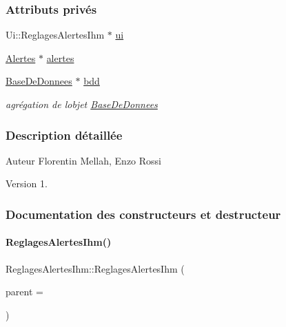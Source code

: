 \subsubsection*{Attributs privés}
\begin{DoxyCompactItemize}
\item 
Ui\+::\+Reglages\+Alertes\+Ihm $\ast$ \hyperlink{class_reglages_alertes_ihm_af3a1fcc84fb1c76248b330372947b245}{ui}
\item 
\hyperlink{class_alertes}{Alertes} $\ast$ \hyperlink{class_reglages_alertes_ihm_a9afa97e737d3c6a9a28a23fc4bc4beeb}{alertes}
\item 
\hyperlink{class_base_de_donnees}{Base\+De\+Donnees} $\ast$ \hyperlink{class_reglages_alertes_ihm_a91b511776c98009cf8f951ec9f3e564e}{bdd}
\begin{DoxyCompactList}\small\item\em agrégation de l\textquotesingle{}objet \hyperlink{class_base_de_donnees}{Base\+De\+Donnees} \end{DoxyCompactList}\end{DoxyCompactItemize}


\subsubsection{Description détaillée}
\begin{DoxyAuthor}{Auteur}
Florentin Mellah, Enzo Rossi
\end{DoxyAuthor}
\begin{DoxyVersion}{Version}
1. 
\end{DoxyVersion}


\subsubsection{Documentation des constructeurs et destructeur}
\mbox{\label{class_reglages_alertes_ihm_ae6337f2d05a3184e48bf5022a91f06c7}} 
\paragraph{\texorpdfstring{Reglages\+Alertes\+Ihm()}{ReglagesAlertesIhm()}}
{\footnotesize\ttfamily Reglages\+Alertes\+Ihm\+::\+Reglages\+Alertes\+Ihm (\begin{DoxyParamCaption}\item[{\hyperlink{class_q_widget}{Q\+Widget} $\ast$}]{parent = {} }\end{DoxyParamCaption})\hspace{0.3cm}{\ttfamily [explicit]}}


